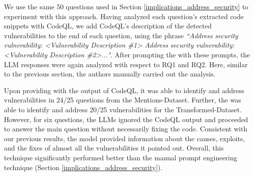 We use the same 50 questions used in Section \ref{implications_address_security} to experiment with this approach. Having analyzed each question's extracted code snippets with CodeQL, we add CodeQL's description of the detected vulnerabilities to the end of each question, using the phrase \textit{``Address security vulnerability: \textless Vulnerability Description \#1\textgreater{} Address security vulnerability: \textless Vulnerability Description \#2\textgreater{}..."}. After prompting the \gpt with these prompts, the LLM responses were again analyzed with respect to RQ1 and RQ2. Here, similar to the previous section, the authors manually carried out the analysis.

Upon providing \gpt with the output of CodeQL, it was able to identify and address vulnerabilities in 24/25 questions from the Mentions-Dataset. Further, the \gpt was able to identify and address 20/25 vulnerabilities for the Transformed-Dataset. However, for six questions, the LLMs ignored the CodeQL output and proceeded to answer the main question without necessarily fixing the code. Consistent with our previous results, the model provided information about the causes, exploits, and the fixes of almost all the vulnerabilities it pointed out. Overall, this technique significantly performed better than the manual prompt engineering technique (Section \ref{implications_address_security}).


